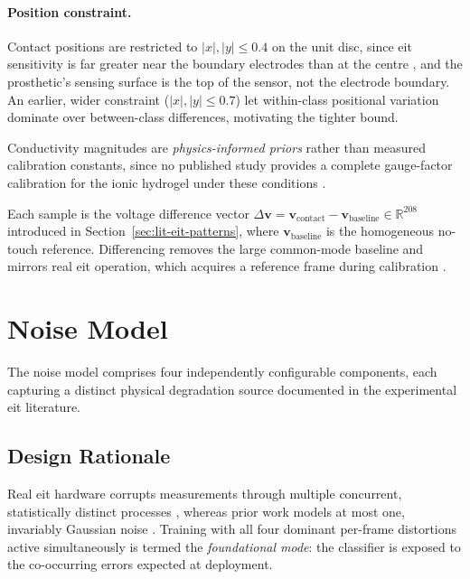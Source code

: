 \paragraph{Position constraint.} Contact positions are restricted to $|x|, |y| \leq 0.4$ on the unit disc, since \gls{eit} sensitivity is far greater near the boundary electrodes than at the centre \parencite{adler2006}, and the prosthetic's sensing surface is the top of the sensor, not the electrode boundary. An earlier, wider constraint ($|x|, |y| \leq 0.7$) let within-class positional variation dominate over between-class differences, motivating the tighter bound.

Conductivity magnitudes are \emph{physics-informed priors} rather than measured calibration constants, since no published study provides a complete gauge-factor calibration for the ionic hydrogel under these conditions \parencite{costacornella2023}.

Each sample is the voltage difference vector $\Delta \mathbf{v} = \mathbf{v}_{\text{contact}} - \mathbf{v}_{\text{baseline}} \in \mathbb{R}^{208}$ introduced in Section~\ref{sec:lit-eit-patterns}, where $\mathbf{v}_{\text{baseline}}$ is the homogeneous no-touch reference. Differencing removes the large common-mode baseline and mirrors real \gls{eit} operation, which acquires a reference frame during calibration \parencite{adler2006}.

\section{Noise Model}
\label{sec:method-noise}

The noise model comprises four independently configurable components, each capturing a distinct physical degradation source documented in the experimental \gls{eit} literature.

\subsection{Design Rationale}
\label{sec:method-noise-rationale}

Real \gls{eit} hardware corrupts measurements through multiple concurrent, statistically distinct processes \parencite{adler2006, vilhunen2002, boone1996}, whereas prior work models at most one, invariably Gaussian noise \parencite{chen2023, park2022skin}. Training with all four dominant per-frame distortions active simultaneously is termed the \emph{foundational mode}: the classifier is exposed to the co-occurring errors expected at deployment.

